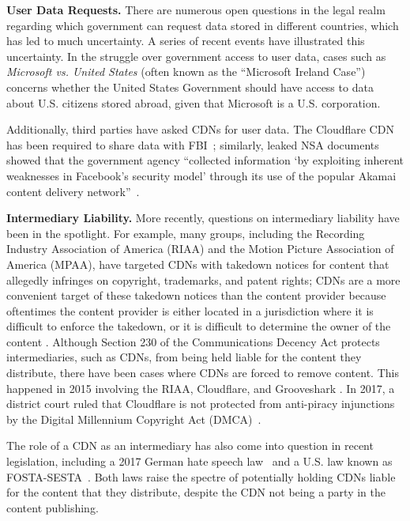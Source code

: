 \textbf{User Data Requests.}
There are numerous open questions in the legal realm regarding which government can request data stored in different countries, which 
has led to much uncertainty.  A series of recent events have illustrated this uncertainty.  In the struggle over government access to 
user data, cases such as {\it Microsoft vs. United States} (often known as the ``Microsoft Ireland Case'') concerns whether the United 
States Government should have access to data about U.S. citizens stored abroad, given that Microsoft is a U.S. corporation.  

Additionally, third parties have asked CDNs for user data.  The Cloudflare CDN has
been required
to share data with FBI~\cite{cloudflare_nsl}; similarly, leaked NSA documents showed
that the government agency ``collected information `by exploiting inherent 
weaknesses in Facebook's security model' through its use of the popular Akamai content
delivery network''~\cite{facebook_surv}.

\textbf{Intermediary Liability.}
More recently, questions on intermediary liability have been in the spotlight.  For example, many groups, including the Recording Industry 
Association of America (RIAA) and the Motion Picture Association of America (MPAA), have targeted CDNs with takedown notices for 
content that allegedly infringes on copyright, trademarks, and patent rights; CDNs are a more convenient target of these takedown notices than 
the content provider because oftentimes the content provider is either located in a jurisdiction where it is difficult to enforce the takedown, 
or it is difficult to determine the owner of the content \cite{medium_copyright,eff_copyright}.
Although Section 230 of the Communications Decency Act protects intermediaries,
such as CDNs, from being held
liable for the content they distribute, there have been cases where CDNs are forced
to remove content.  This happened in 2015 involving the RIAA, Cloudflare, and Grooveshark \cite{techdirt_copyright}. In 2017, a district court ruled that Cloudflare is not protected from anti-piracy injunctions by the Digital Millennium Copyright Act (DMCA)~\cite{stack_copyright}.

The role of a CDN as an intermediary has also come into question in recent legislation, including a 2017 German hate speech law~\cite{netenforementact} and a U.S. law known as FOSTA-SESTA~\cite{fosta_sesta}. Both laws raise the spectre of potentially holding CDNs liable for the content that they distribute, despite the CDN not being a party in the content publishing.

